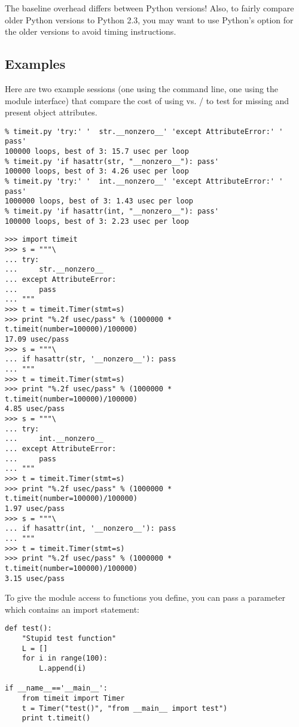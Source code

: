 The baseline overhead differs between Python versions!  Also, to
fairly compare older Python versions to Python 2.3, you may want to
use Python's  option for the older versions to avoid
timing  instructions.

\subsection{Examples}

Here are two example sessions (one using the command line, one using
the module interface) that compare the cost of using
 vs. / to test for
missing and present object attributes.

\begin{verbatim}
% timeit.py 'try:' '  str.__nonzero__' 'except AttributeError:' '  pass'
100000 loops, best of 3: 15.7 usec per loop
% timeit.py 'if hasattr(str, "__nonzero__"): pass'
100000 loops, best of 3: 4.26 usec per loop
% timeit.py 'try:' '  int.__nonzero__' 'except AttributeError:' '  pass'
1000000 loops, best of 3: 1.43 usec per loop
% timeit.py 'if hasattr(int, "__nonzero__"): pass'
100000 loops, best of 3: 2.23 usec per loop
\end{verbatim}

\begin{verbatim}
>>> import timeit
>>> s = """\
... try:
...     str.__nonzero__
... except AttributeError:
...     pass
... """
>>> t = timeit.Timer(stmt=s)
>>> print "%.2f usec/pass" % (1000000 * t.timeit(number=100000)/100000)
17.09 usec/pass
>>> s = """\
... if hasattr(str, '__nonzero__'): pass
... """
>>> t = timeit.Timer(stmt=s)
>>> print "%.2f usec/pass" % (1000000 * t.timeit(number=100000)/100000)
4.85 usec/pass
>>> s = """\
... try:
...     int.__nonzero__
... except AttributeError:
...     pass
... """
>>> t = timeit.Timer(stmt=s)
>>> print "%.2f usec/pass" % (1000000 * t.timeit(number=100000)/100000)
1.97 usec/pass
>>> s = """\
... if hasattr(int, '__nonzero__'): pass
... """
>>> t = timeit.Timer(stmt=s)
>>> print "%.2f usec/pass" % (1000000 * t.timeit(number=100000)/100000)
3.15 usec/pass
\end{verbatim}

To give the \module{timeit} module access to functions you
define, you can pass a  parameter which contains an import
statement:

\begin{verbatim}
def test():
    "Stupid test function"
    L = []
    for i in range(100):
        L.append(i)

if __name__=='__main__':
    from timeit import Timer
    t = Timer("test()", "from __main__ import test")
    print t.timeit()
\end{verbatim}
